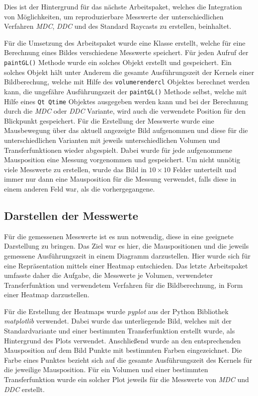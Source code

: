 Dies ist der Hintergrund für das nächste Arbeitspaket, welches die Integration von Möglichkeiten, um reproduzierbare Messwerte der unterschiedlichen Verfahren \emph{MDC}, \emph{DDC} und des Standard Raycasts zu erstellen, beinhaltet.

Für die Umsetzung des Arbeitspaket wurde eine Klasse erstellt, welche für eine Berechnung eines Bildes verschiedene Messwerte speichert.
Für jeden Aufruf der \texttt{paintGL()} Methode wurde ein solches Objekt erstellt und gespeichert.
Ein solches Objekt hält unter Anderem die gesamte Ausführungszeit der Kernels einer Bildberechung, welche mit Hilfe des \texttt{volumerendercl} Objektes berechnet werden kann, die ungefähre Ausführungszeit der \texttt{paintGL()} Methode selbst, welche mit Hilfe eines \texttt{Qt Qtime} Objektes ausgegeben werden kann und bei der Berechnung durch die \emph{MDC} oder \emph{DDC} Variante, wird auch die verwendete Position für den Blickpunkt gespeichert.
Für die Erstellung der Messwerte wurde eine Mausbewegung über das aktuell angezeigte Bild aufgenommen und diese für die unterschiedlichen Varianten mit jeweils unterschiedlichen Volumen und Transferfunktionen wieder abgespielt.
Dabei wurde für jede aufgenommene Mausposition eine Messung vorgenommen und gespeichert.
Um nicht unnötig viele Messwerte zu erstellen, wurde das Bild in $10\times10$ Felder unterteilt und immer nur dann eine Mausposition für die Messung verwendet, falls diese in einem anderen Feld war, als die vorhergegangene.

\subsection{Darstellen der Messwerte}
Für die gemessenen Messwerte ist es nun notwendig, diese in eine geeignete Darstellung zu bringen.
Das Ziel war es hier, die Mauspositionen und die jeweils gemessene Ausführungszeit in einem Diagramm darzustellen.
Hier wurde sich für eine Repräsentation mittels einer Heatmap entschieden.
Das letzte Arbeitspaket umfasste daher die Aufgabe, die Messwerte je Volumen, verwendeter Transferfunktion und verwendetem Verfahren für die Bildberechnung, in Form einer Heatmap darzustellen.

Für die Erstellung der Heatmaps wurde \emph{pyplot} aus der Python Bibliothek \emph{matplotlib} verwendet.
Dabei wurde das unterliegende Bild, welches mit der Standardvariante und einer bestimmten Transferfunktion erstellt wurde, als Hintergrund des Plots verwendet.
Anschließend wurde an den entsprechenden Mausposition auf dem Bild Punkte mit bestimmten Farben eingezeichnet.
Die Farbe eines Punktes bezieht sich auf die gesamte Ausführungszeit des Kernels für die jeweilige Mausposition.
Für ein Volumen und einer bestimmten Transferfunktion wurde ein solcher Plot jeweils für die Messwerte von \emph{MDC} und \emph{DDC} erstellt.
